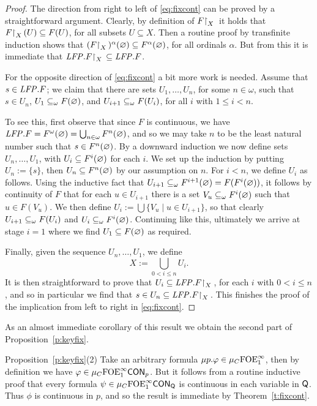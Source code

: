 \begin{proof}
The direction from right to left of \eqref{eq:fixcont} can be proved by a 
straightforward argument.
Clearly, by definition of $F{\upharpoonright}_{X}\,$ it holds that $F{\upharpoonright}_{X}\,(U) \subseteq F(U)$, 
for all subsets $U \subseteq X$.
Then a routine proof by transfinite induction shows that 
$(F{\upharpoonright}_{X}\,)^{\alpha}(\varnothing) \subseteq F^{\alpha}(\varnothing)$, for all ordinals 
$\alpha$.
But from this it is immediate that $\mathit{LFP}.F{\upharpoonright}_{X}\, \subseteq \mathit{LFP}. F$.

For the opposite direction of \eqref{eq:fixcont} a bit more work is needed.
Assume that $s \in \mathit{LFP}. F$; we claim that there are sets $U_{1},\ldots,U_{n}$,
for some $n \in \omega$, such that $s \in U_{n}$, $U_{1} \subseteq_{\omega} F(\varnothing)$,
and $U_{i+1} \subseteq_{\omega} F(U_{i})$, for all $i$ with $1 \leq i < n$.

To see this, first observe that since $F$ is continuous, we have $\mathit{LFP}. F = 
F^{\omega}(\varnothing) = \bigcup_{n\in\omega}F^{n}(\varnothing)$, and so we may take $n$ to
be the least natural number such that $s \in F^{n}(\varnothing)$.
By a downward induction we now define sets $U_{n},\ldots,U_{1}$, with $U_{i} 
\subseteq F^{i}(\varnothing)$ for each $i$. 
We set up the induction by putting $U_{n} \mathrel{:=} \{ s \}$, then $U_{n}
\subseteq F^{n}(\varnothing)$ by our assumption on $n$.
For $i<n$, we define $U_{i}$ as follows.
Using the inductive fact that $U_{i+1} \subseteq_{\omega} F^{i+1}(\varnothing) = 
F(F^{i}(\varnothing))$, it follows by continuity of $F$ that for each $u \in U_{i+1}$
there is a set $V_{u} \subseteq_{\omega} F^{i}(\varnothing)$ such that $u \in F(V_{u})$.
We then define $U_{i} \mathrel{:=} \bigcup \{ V_{u} \mid u \in U_{i+1} \}$,
so that clearly $U_{i+1} \subseteq_{\omega} F(U_{i})$ and $U_{i} \subseteq_{\omega}
F^{i}(\varnothing)$.
Continuing like this, ultimately we arrive at stage $i=1$ where we find
$U_{1} \subseteq F(\varnothing)$ as required.

Finally, given the sequence $U_{n},\ldots,U_{1}$, we define 
\[
X \mathrel{:=} \bigcup_{0<i\leq n} U_{i}.
\]
It is then straightforward to prove that $U_{i} \subseteq \mathit{LFP}. F{\upharpoonright}_{X}\,$, for each 
$i$ with $0<i\leq n$, and so in particular we find that $s \in U_{n} \subseteq \mathit{LFP}.
F{\upharpoonright}_{X}\,$.
This finishes the proof of the implication from left to right in 
\eqref{eq:fixcont}.
\end{proof}

\noindent
As an almost immediate corollary of this result we obtain the second part of 
Proposition~\ref{p:keyfix}.

\begin{proofof}{Proposition~\ref{p:keyfix}(2)}
Take an arbitrary formula $\mu p. \varphi \in \mu_{C}\mathrm{FOE}^{\infty}_1$, then by definition 
we have $\varphi \in \mu_{C}\mathrm{FOE}^{\infty}_1\mathsf{CON}_{p}$.
But it follows from a routine inductive proof that every formula $\psi \in 
\mu_{C}\mathrm{FOE}^{\infty}_1\mathsf{CON}_{\mathsf{Q}}$ is continuous in each variable in $\mathsf{Q}$.
Thus $\phi$ is continuous in $p$, and so the result is immediate by 
Theorem~\ref{t:fixcont}.
\end{proofof}

